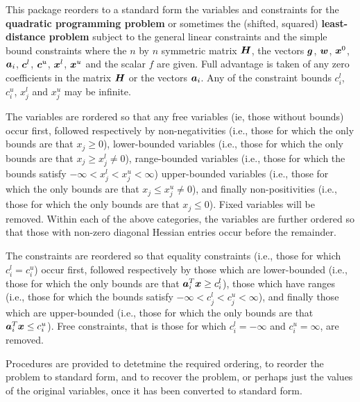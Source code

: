 \documentclass{galahad}
\begin{document}
\galheader


\galsummary
This package reorders to a standard form the variables and constraints
for the {\bf quadratic programming problem}
or sometimes the (shifted, squared) {\bf least-distance problem}
subject to the general linear constraints
and the simple bound constraints
where the $n$ by $n$ symmetric matrix ${\bm{H}}$, the 
vectors ${\bm{g}}$, ${\bm{w}}$, ${\bm{x}}^{0}$,
${\bm{a}}_{i}$, ${\bm{c}}^{l}$, ${\bm{c}}^{u}$, ${\bm{x}}^{l}$, 
${\bm{x}}^{u}$ and the scalar $f$ are given.
Full advantage is taken of any zero coefficients in the matrix ${\bm{H}}$ or the
vectors ${\bm{a}}_{i}$. 
Any of the constraint bounds $c_{i}^{l}$, $c_{i}^{u}$, 
$x_{j}^{l}$ and $x_{j}^{u}$ may be infinite.

The variables are rordered so that any
free variables (ie, those without bounds) occur first, followed
respectively by 
non-negativities (i.e., those for which the only
bounds are that $x_j \geq 0$),
lower-bounded variables (i.e., those for which the only
bounds are that $x_j \geq x_j^l \neq 0$),
range-bounded variables (i.e., those for which the 
bounds satisfy $- \infty < x_j^l < x_j^u < \infty$)
upper-bounded variables (i.e., those for which the only
bounds are that $x_j \leq x_j^u \neq 0$), and finally
non-positivities (i.e., those for which the only
bounds are that $x_j \leq 0$).
Fixed variables will be removed. Within each of the above categories, 
the variables are further ordered so that those with non-zero diagonal Hessian 
entries occur before the remainder.

The constraints are reordered so that equality constraints (i.e., those
for which $c_i^l = c_i^u$) occur first, followed 
respectively by those 
which are lower-bounded (i.e., those for which the only
bounds are that ${\bm{a}}_i^T {\bm{x}} \geq c_i^l$),
those which have ranges (i.e., those for which the 
bounds satisfy 
$- \infty < c_j^l < c_j^u < \infty$), 
and finally those which are upper-bounded (i.e., those for which the only
bounds are that ${\bm{a}}_i^T {\bm{x}} \leq c_i^u$).
Free constraints, that is those for which 
$c_i^l = - \infty$ and $c_i^u = \infty$, are removed.

Procedures are provided to detetmine the required ordering, to
reorder the problem to standard form, and
to recover the problem, or perhaps just the values of
the original variables, once it has been converted to standard form.
\end{document}
